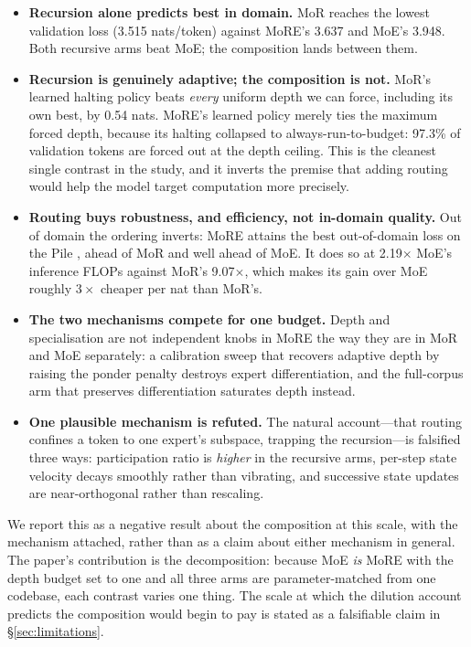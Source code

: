 \begin{itemize}[leftmargin=1.4em,itemsep=1.5pt,topsep=2pt]
\item \textbf{Recursion alone predicts best in domain.} MoR reaches the lowest
  validation loss (3.515 nats/token) against MoRE's 3.637 and MoE's 3.948. Both
  recursive arms beat MoE; the composition lands between them.

\item \textbf{Recursion is genuinely adaptive; the composition is not.} MoR's
  learned halting policy beats \emph{every} uniform depth we can force, including
  its own best, by 0.54 nats. MoRE's learned policy merely ties the maximum
  forced depth, because its halting collapsed to always-run-to-budget: 97.3\% of
  validation tokens are forced out at the depth ceiling. This is the cleanest
  single contrast in the study, and it inverts the premise that adding routing
  would help the model target computation more precisely.

\item \textbf{Routing buys robustness, and efficiency, not in-domain quality.}
  Out of domain the ordering inverts: MoRE attains the best out-of-domain loss on
  the Pile \citep{gao2020pile}, ahead of MoR and well ahead of MoE. It does so at
  2.19$\times$ MoE's inference FLOPs against MoR's 9.07$\times$, which makes its
  gain over MoE roughly $3\times$ cheaper per nat than MoR's.

\item \textbf{The two mechanisms compete for one budget.} Depth and
  specialisation are not independent knobs in MoRE the way they are in MoR and
  MoE separately: a calibration sweep that recovers adaptive depth by raising the
  ponder penalty destroys expert differentiation, and the full-corpus arm that
  preserves differentiation saturates depth instead.

\item \textbf{One plausible mechanism is refuted.} The natural account---that
  routing confines a token to one expert's subspace, trapping the recursion---is
  falsified three ways: participation ratio is \emph{higher} in the recursive
  arms, per-step state velocity decays smoothly rather than vibrating, and
  successive state updates are near-orthogonal rather than rescaling.
\end{itemize}

We report this as a negative result about the composition at this scale, with the
mechanism attached, rather than as a claim about either mechanism in general. The
paper's contribution is the decomposition: because MoE \emph{is} MoRE with the
depth budget set to one and all three arms are parameter-matched from one
codebase, each contrast varies one thing. The scale at which the dilution account
predicts the composition would begin to pay is stated as a falsifiable claim in
\S\ref{sec:limitations}.

